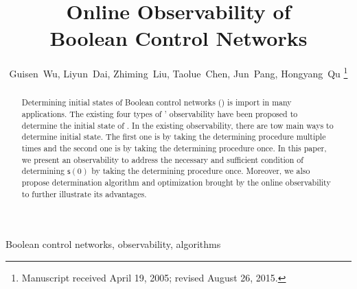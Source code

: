 \documentclass[10pt,journal,compsoc]{IEEEtran}
\begin{document}
\title{Online Observability of \\ 
	Boolean Control Networks}
\author{Guisen~Wu,
	Liyun~Dai\Envelope,
	Zhiming~Liu,
	Taolue~Chen,
	Jun~Pang,
	Hongyang~Qu
\thanks{Manuscript received April 19, 2005; revised August 26, 2015.}
}
 
\maketitle



\begin{abstract}
Determining initial states of Boolean control networks (\BCNs)  is import in many applications. The existing  four types of \BCNs' observability  have been proposed to determine the initial state of \BCNs. In the existing observability, there are tow main ways to determine initial state. The first one is by taking the determining procedure multiple times and the second one is by taking the determining procedure once. In this paper, we present an observability to address the necessary and sufficient condition of determining $\mathsf{s}(0)$ by taking the determining procedure once. %
Moreover, we also propose determination algorithm and optimization brought by the online observability to further illustrate its advantages.
\end{abstract}

\begin{IEEEkeywords}
Boolean control networks, observability, algorithms
\end{IEEEkeywords}


\IEEEpeerreviewmaketitle








 
 

\end{document}
